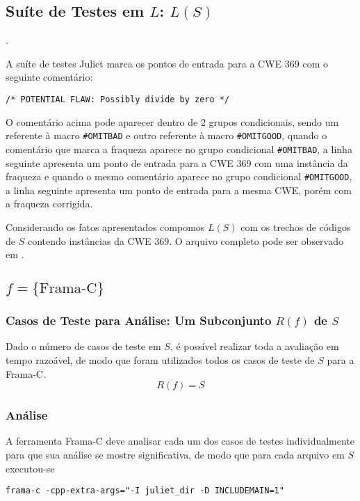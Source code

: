   \subsection{Suíte de Testes em $L$: $L(S)$}.

  A suíte de testes Juliet marca os pontos de entrada para a CWE 369 com o seguinte comentário:

  \lstinline{/* POTENTIAL FLAW: Possibly divide by zero */}

  O comentário acima pode aparecer dentro de 2 grupos condicionais, sendo um referente à macro \lstinline{#OMITBAD} e outro referente à macro \lstinline{#OMITGOOD}, quando o comentário que marca a fraqueza aparece no grupo condicional \lstinline{#OMITBAD}, a linha seguinte apresenta um ponto de entrada para a CWE 369 com uma instância da fraqueza e quando o mesmo comentário aparece no grupo condicional \lstinline{#OMITGOOD}, a linha seguinte apresenta um ponto de entrada para a mesma CWE, porém com a fraqueza corrigida.

  Considerando os fatos apresentados compomos $L(S)$ com os trechos de códigos de $S$ contendo instâncias da CWE 369. O arquivo completo pode ser observado em .

  \subsection{$f = \{\mbox{Frama-C}\}$}
  \subsubsection{Casos de Teste para Análise: Um Subconjunto $R(f)$ de $S$}

  Dado o número de casos de teste em $S$, é possível realizar toda a avaliação em tempo razoável, de modo que foram utilizados todos os casos de teste de $S$ para a Frama-C.
  \begin{equation}
    R(f) = S
  \end{equation}

  \subsubsection{Análise}

  A ferramenta Frama-C deve analisar cada um dos casos de testes individualmente para que sua análise se mostre significativa, de modo que para cada arquivo em $S$ executou-se

  \lstinline[mathescape=false]{frama-c -cpp-extra-args="-I juliet_dir -D INCLUDEMAIN=1"}

